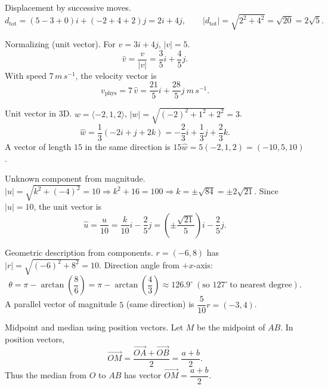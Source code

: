 \documentclass[11pt]{article}
\def\textbf#1{#1}%
\def\mathbf#1{#1}%
\def\mathrm#1{#1}%
\begin{document}
\begin{solution}
\textbf{Displacement by successive moves.}
\[
\mathbf{d}_{\text{tot}}=(5-3+0)\mathbf{i}+(-2+4+2)\mathbf{j}=2\mathbf{i}+4\mathbf{j},\qquad
|\mathbf{d}_{\text{tot}}|=\sqrt{2^2+4^2}=\sqrt{20}=2\sqrt{5}.
\]
\end{solution}

\begin{solution}
\textbf{Normalizing (unit vector).}
For $\mathbf{v}=3\mathbf{i}+4\mathbf{j}$, $|\mathbf{v}|=5$.
\[
\hat{\mathbf{v}}=\frac{\mathbf{v}}{|\mathbf{v}|}=\frac{3}{5}\mathbf{i}+\frac{4}{5}\mathbf{j}.
\]
With speed $7\,\mathrm{m\,s^{-1}}$, the velocity vector is
\[
\mathbf{v}_{\text{phys}}=7\,\hat{\mathbf{v}}=\frac{21}{5}\mathbf{i}+\frac{28}{5}\mathbf{j}\ \mathrm{m\,s^{-1}}.
\]
\end{solution}

\begin{solution}
\textbf{Unit vector in 3D.}
$\mathbf{w}=\langle -2,1,2\rangle$, $|\mathbf{w}|=\sqrt{(-2)^2+1^2+2^2}=3$.
\[
\hat{\mathbf{w}}=\frac{1}{3}(-2\mathbf{i}+\mathbf{j}+2\mathbf{k})
=-\frac{2}{3}\mathbf{i}+\frac{1}{3}\mathbf{j}+\frac{2}{3}\mathbf{k}.
\]
A vector of length $15$ in the same direction is $15\hat{\mathbf{w}}=5(-2,1,2)=(-10,5,10)$.
\end{solution}

\begin{solution}
\textbf{Unknown component from magnitude.}
$|\mathbf{u}|=\sqrt{k^2+(-4)^2}=10\Rightarrow k^2+16=100\Rightarrow k=\pm\sqrt{84}=\pm2\sqrt{21}$.
Since $|\mathbf{u}|=10$, the unit vector is
\[
\hat{\mathbf{u}}=\frac{\mathbf{u}}{10}=\frac{k}{10}\mathbf{i}-\frac{2}{5}\mathbf{j}
=\left(\pm\frac{\sqrt{21}}{5}\right)\mathbf{i}-\frac{2}{5}\mathbf{j}.
\]
\end{solution}

\begin{solution}
\textbf{Geometric description from components.}
$\mathbf{r}=(-6,8)$ has $|\mathbf{r}|=\sqrt{(-6)^2+8^2}=10$.
Direction angle from $+x$-axis:
\[
\theta=\pi-\arctan\!\left(\frac{8}{6}\right)=\pi-\arctan\!\left(\frac{4}{3}\right)\approx 126.9^\circ\ (\text{so }127^\circ\ \text{to nearest degree}).
\]
A parallel vector of magnitude $5$ (same direction) is $\dfrac{5}{10}\mathbf{r}=(-3,4)$.
\end{solution}

\begin{solution}
\textbf{Midpoint and median using position vectors.}
Let $M$ be the midpoint of $AB$. In position vectors,
\[
\overrightarrow{OM}=\frac{\overrightarrow{OA}+\overrightarrow{OB}}{2}
=\frac{\mathbf{a}+\mathbf{b}}{2}.
\]
Thus the median from $O$ to $AB$ has vector $\overrightarrow{OM}=\dfrac{\mathbf{a}+\mathbf{b}}{2}$.
\end{solution}
\end{document}
